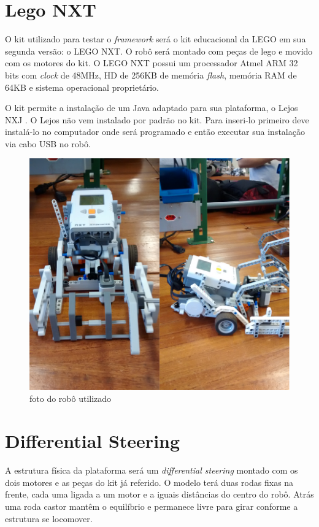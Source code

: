 \section{Lego NXT}

O kit utilizado para testar o \textit{framework} será o kit educacional da LEGO em sua segunda versão: o LEGO NXT. O robô será montado com peças de lego e movido com os motores do kit. O LEGO NXT possui um processador Atmel ARM 32 bits com \textit{clock} de 48MHz, HD de 256KB de memória \textit{flash}, memória RAM de 64KB e sistema operacional proprietário.

O kit permite a instalação de um Java adaptado para sua plataforma, o Lejos NXJ \cite{LEJOS_SITE}. O Lejos não vem instalado por padrão no kit. Para inseri-lo primeiro deve instalá-lo no computador onde será programado e então executar sua instalação via cabo USB no robô.

\begin{figure}[h]
	\centering
	\label{fig17}
		\includegraphics[keepaspectratio=true,scale=0.2]{figuras/5nxtBrick.png}
	\caption{foto do robô utilizado}
\end{figure}

\section{Differential Steering}

A estrutura física da plataforma será um \textit{differential steering} montado com os dois motores e as peças do kit já referido. O modelo terá duas rodas fixas na frente, cada uma ligada a um motor e a iguais distâncias do centro do robô. Atrás uma roda castor mantêm o equilíbrio e permanece livre para girar conforme a estrutura se locomover.

